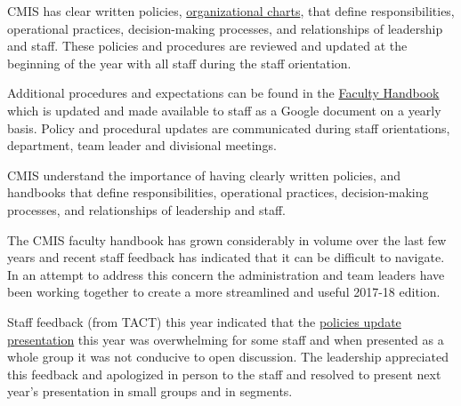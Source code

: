 

\begin{findings}
CMIS has clear written policies, \href{https://drive.google.com/a/cmis.ac.th/file/d/0Bwny3HLdIIS7RF9veFk5UXB2Q2M/view?usp=sharing}{organizational charts}, that define responsibilities, operational practices, decision-making processes, and relationships of leadership and staff. These policies and procedures are reviewed and updated at the beginning of the year with all staff during the staff orientation.

Additional procedures and expectations can be found in the \href{https://docs.google.com/a/cmis.ac.th/document/d/1DrXVXsgw4U62HCGOceOKsgC8V1LDQFhHKgDB35oq4wY/edit?usp=sharing}{Faculty Handbook} which is updated and made available to staff as a Google document on a yearly basis. Policy and procedural updates are communicated during staff orientations, department, team leader and divisional meetings.


CMIS understand the importance of having clearly written policies, and handbooks that define responsibilities, operational practices, decision-making processes, and relationships of leadership and staff. 

The CMIS faculty handbook has grown considerably in volume over the last few years and recent staff feedback has indicated that it can be difficult to navigate. In an attempt to address this concern the administration and team leaders have been working together to create a more streamlined and useful  2017-18 edition. 

Staff feedback (from TACT) this year indicated that the \href{https://docs.google.com/a/cmis.ac.th/presentation/d/18ekiAcUSiwa7oJM9tdwe2OSfnC_47RkbLz8ZjEt6O9I/edit?usp=sharing}{policies update presentation} this year was overwhelming for some staff and when presented as a whole group it was not conducive to open discussion. The leadership appreciated this feedback and apologized in person to the staff and resolved to present next year's presentation in small groups and in segments. 
\end{findings}

